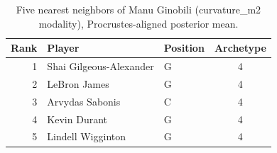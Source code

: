 \begin{table}[htbp]
  \centering\small
  \begin{tabular}{rllc}
    \toprule
    Rank & Player & Position & Archetype \\
    \midrule
    1 & Shai Gilgeous-Alexander & G & 4 \\
    2 & LeBron James & G & 4 \\
    3 & Arvydas Sabonis & C & 4 \\
    4 & Kevin Durant & G & 4 \\
    5 & Lindell Wigginton & G & 4 \\
    \bottomrule
  \end{tabular}
  \caption{Five nearest neighbors of Manu Ginobili (curvature_m2 modality), Procrustes-aligned posterior mean.}
  \label{tab:Manu_Ginobili_neighbors_curvature_m2}
\end{table}

